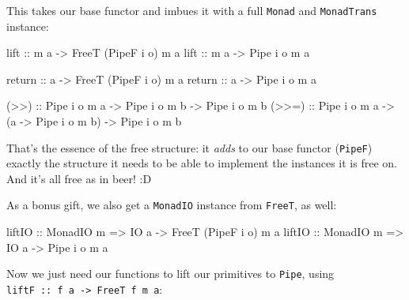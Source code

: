 \documentclass[]{article}
\newenvironment{Shaded}{}{}
\newcommand{\DataTypeTok}[1]{\textcolor[rgb]{0.56,0.13,0.00}{#1}}
\newcommand{\FunctionTok}[1]{\textcolor[rgb]{0.02,0.16,0.49}{#1}}
\newcommand{\NormalTok}[1]{#1}
\newcommand{\OtherTok}[1]{\textcolor[rgb]{0.00,0.44,0.13}{#1}}
\begin{document}
This takes our base functor and imbues it with a full \texttt{Monad} and
\texttt{MonadTrans} instance:

\begin{Shaded}
\begin{Highlighting}[]
\OtherTok{lift ::}\NormalTok{ m a }\OtherTok{{-}\textgreater{}} \DataTypeTok{FreeT}\NormalTok{ (}\DataTypeTok{PipeF}\NormalTok{ i o) m a}
\OtherTok{lift ::}\NormalTok{ m a }\OtherTok{{-}\textgreater{}} \DataTypeTok{Pipe}\NormalTok{ i o m a}

\FunctionTok{return}\OtherTok{ ::}\NormalTok{ a }\OtherTok{{-}\textgreater{}} \DataTypeTok{FreeT}\NormalTok{ (}\DataTypeTok{PipeF}\NormalTok{ i o) m a}
\FunctionTok{return}\OtherTok{ ::}\NormalTok{ a }\OtherTok{{-}\textgreater{}} \DataTypeTok{Pipe}\NormalTok{ i o m a}

\OtherTok{(\textgreater{}\textgreater{})  ::} \DataTypeTok{Pipe}\NormalTok{ i o m a }\OtherTok{{-}\textgreater{}} \DataTypeTok{Pipe}\NormalTok{ i o m b }\OtherTok{{-}\textgreater{}} \DataTypeTok{Pipe}\NormalTok{ i o m b}
\OtherTok{(\textgreater{}\textgreater{}=) ::} \DataTypeTok{Pipe}\NormalTok{ i o m a }\OtherTok{{-}\textgreater{}}\NormalTok{ (a }\OtherTok{{-}\textgreater{}} \DataTypeTok{Pipe}\NormalTok{ i o m b) }\OtherTok{{-}\textgreater{}} \DataTypeTok{Pipe}\NormalTok{ i o m b}
\end{Highlighting}
\end{Shaded}

That's the essence of the free structure: it \emph{adds} to our base functor
(\texttt{PipeF}) exactly the structure it needs to be able to implement the
instances it is free on. And it's all free as in beer! :D

As a bonus gift, we also get a \texttt{MonadIO} instance from \texttt{FreeT}, as
well:

\begin{Shaded}
\begin{Highlighting}[]
\OtherTok{liftIO ::} \DataTypeTok{MonadIO}\NormalTok{ m }\OtherTok{=\textgreater{}} \DataTypeTok{IO}\NormalTok{ a }\OtherTok{{-}\textgreater{}} \DataTypeTok{FreeT}\NormalTok{ (}\DataTypeTok{PipeF}\NormalTok{ i o) m a}
\OtherTok{liftIO ::} \DataTypeTok{MonadIO}\NormalTok{ m }\OtherTok{=\textgreater{}} \DataTypeTok{IO}\NormalTok{ a }\OtherTok{{-}\textgreater{}} \DataTypeTok{Pipe}\NormalTok{ i o m a}
\end{Highlighting}
\end{Shaded}

Now we just need our functions to lift our primitives to \texttt{Pipe}, using
\texttt{liftF\ ::\ f\ a\ -\textgreater{}\ FreeT\ f\ m\ a}:
\end{document}
